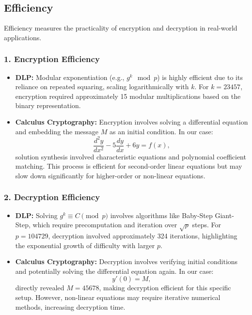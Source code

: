 \documentclass[12pt]{article}
\begin{document}
\subsection*{Efficiency}

Efficiency measures the practicality of encryption and decryption in real-world applications.

\subsubsection*{1. Encryption Efficiency}
\begin{itemize}
    \item \textbf{DLP:} Modular exponentiation (e.g., \( g^k \mod p \)) is highly efficient due to its reliance on repeated squaring, scaling logarithmically with \( k \). For \( k = 23457 \), encryption required approximately 15 modular multiplications based on the binary representation.
    \item \textbf{Calculus Cryptography:} Encryption involves solving a differential equation and embedding the message \( M \) as an initial condition. In our case:
    \[
    \frac{d^2y}{dx^2} - 5\frac{dy}{dx} + 6y = f(x),
    \]
    solution synthesis involved characteristic equations and polynomial coefficient matching. This process is efficient for second-order linear equations but may slow down significantly for higher-order or non-linear equations.
\end{itemize}

\subsubsection*{2. Decryption Efficiency}
\begin{itemize}
    \item \textbf{DLP:} Solving \( g^k \equiv C \pmod{p} \) involves algorithms like Baby-Step Giant-Step, which require precomputation and iteration over \( \sqrt{p} \) steps. For \( p = 104729 \), decryption involved approximately 324 iterations, highlighting the exponential growth of difficulty with larger \( p \).
    \item \textbf{Calculus Cryptography:} Decryption involves verifying initial conditions and potentially solving the differential equation again. In our case:
    \[
    y'(0) = M,
    \]
    directly revealed \( M = 45678 \), making decryption efficient for this specific setup. However, non-linear equations may require iterative numerical methods, increasing decryption time.
\end{itemize}
\end{document}
